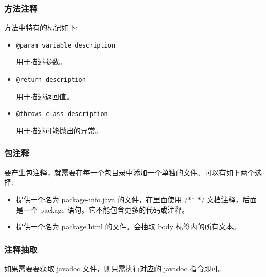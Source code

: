 \subsubsection{方法注释}

方法中特有的标记如下:
\begin{itemize}
    \item \texttt{@param variable description}
    
    用于描述参数。
    \item \texttt{@return description}
    
    用于描述返回值。

    \item \texttt{@throws class description}
    
    用于描述可能抛出的异常。
\end{itemize}

\subsubsection{包注释}

要产生包注释，就需要在每一个包目录中添加一个单独的文件。可以有如下两个选择:
\begin{itemize}
    \item 提供一个名为 package-info.java 的文件，在里面使用 /** */ 文档注释，后面是一个 package 语句。它不能包含更多的代码或注释。
    \item 提供一个名为 package.html 的文件。会抽取 body 标签内的所有文本。
\end{itemize}

\subsubsection{注释抽取}

如果需要要获取 javadoc 文件，则只需执行对应的 javadoc 指令即可。

\newpage